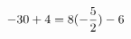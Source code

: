 \documentclass[preview]{standalone}
\begin{document}
\begin{align*}
\special{dvisvgm:raw <g id='unique000'>}-30 + 4 = 8 (- \frac{5}{2}) - 6\special{dvisvgm:raw </g>}
\end{align*}
\end{document}
